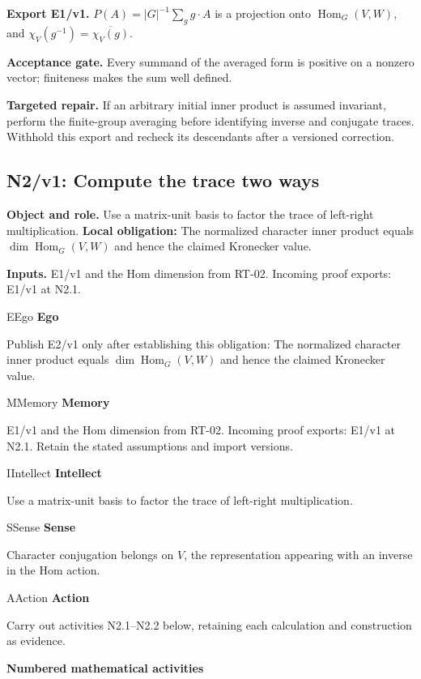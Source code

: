 \documentclass[preprint,12pt,aps,pra,showkeys,amsmath,amssymb,superscriptaddress,floatfix]{revtex4-2}
\theoremstyle{definition}
\theoremstyle{remark}
\newcommand{\mmfaculty}[3]{%
 \begin{mmfacultybox}{#1}{#2}
 {\sffamily\bfseries\color{MMBlue}#2}\par\smallskip #3
 \end{mmfacultybox}}
\newcommand{\field}[2]{\par\smallskip\noindent\textbf{#1.} #2\par}
\begin{document}
\field{Export E1/v1}{\(P(A)=|G|^{-1}\sum_g g\cdot A\) is a projection onto
\(\operatorname{Hom}_G(V,W)\), and
\(\chi_V(g^{-1})=\overline{\chi_V(g)}\).}

\field{Acceptance gate}{Every summand of the averaged form is positive on a nonzero vector;
finiteness makes the sum well defined.}

\field{Targeted repair}{If an arbitrary initial inner product is assumed invariant, perform the
finite-group averaging before identifying inverse and conjugate traces.
Withhold this export and recheck its descendants after a versioned
correction.}

\clearpage

\subsection{N2/v1: Compute the trace two ways}

\field{Object and role}{Use a matrix-unit basis to factor the trace of left-right
multiplication. \textbf{Local obligation:} The normalized character
inner product equals \(\dim\operatorname{Hom}_G(V,W)\) and hence the
claimed Kronecker value.}

\field{Inputs}{E1/v1 and the Hom dimension from RT-02. Incoming proof exports: E1/v1 at
N2.1.}

\mmfaculty{E}{Ego}{Publish E2/v1 only after establishing this obligation: The normalized
character inner product equals \(\dim\operatorname{Hom}_G(V,W)\) and
hence the claimed Kronecker value.}

\mmfaculty{M}{Memory}{E1/v1 and the Hom dimension from RT-02. Incoming proof exports: E1/v1 at
N2.1. Retain the stated assumptions and import versions.}

\mmfaculty{I}{Intellect}{Use a matrix-unit basis to factor the trace of left-right
multiplication.}

\mmfaculty{S}{Sense}{Character conjugation belongs on \(V\), the representation appearing
with an inverse in the Hom action.}

\mmfaculty{A}{Action}{Carry out activities N2.1--N2.2 below, retaining each calculation and
construction as evidence.}

\smallskip\noindent\textbf{Numbered mathematical activities}
\end{document}
